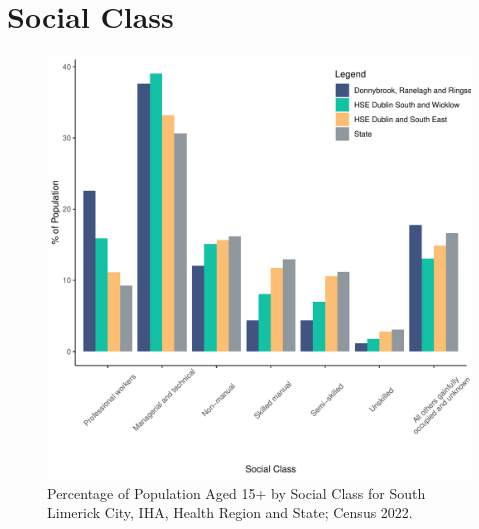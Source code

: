 \documentclass{article}
\begin{document}
\section{Social Class}\label{sect:SC}
\begin{figure}[H]
	\centering
	\includegraphics[width = 140mm]{../figures/SocialClassED.pdf}
	\caption{Percentage of Population Aged 15+ by Social Class for South Limerick City, IHA, Health Region and State; Census 2022.}
	\label{fig:vbnv}
	\end{figure}
\end{document}
